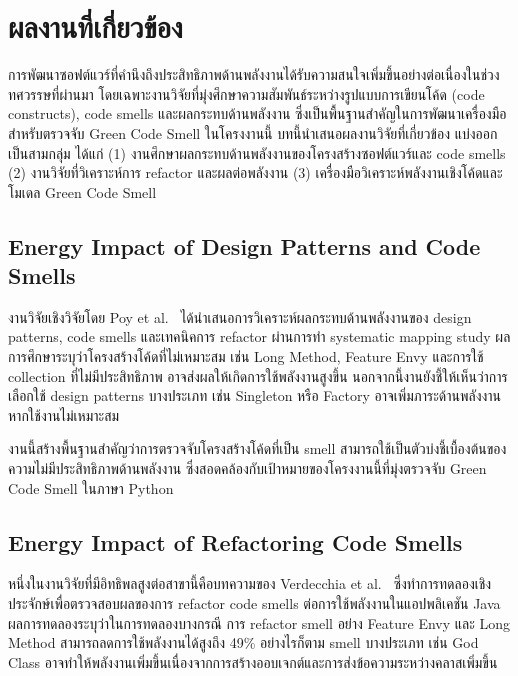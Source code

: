 \chapter{ผลงานที่เกี่ยวข้อง}
\label{Ch:RelatedWork}
การพัฒนาซอฟต์แวร์ที่คำนึงถึงประสิทธิภาพด้านพลังงานได้รับความสนใจเพิ่มขึ้นอย่างต่อเนื่องในช่วงทศวรรษที่ผ่านมา โดยเฉพาะงานวิจัยที่มุ่งศึกษาความสัมพันธ์ระหว่างรูปแบบการเขียนโค้ด (code constructs), code smells และผลกระทบด้านพลังงาน ซึ่งเป็นพื้นฐานสำคัญในการพัฒนาเครื่องมือสำหรับตรวจจับ Green Code Smell ในโครงงานนี้ บทนี้นำเสนอผลงานวิจัยที่เกี่ยวข้อง แบ่งออกเป็นสามกลุ่ม ได้แก่ (1) งานศึกษาผลกระทบด้านพลังงานของโครงสร้างซอฟต์แวร์และ code smells (2) งานวิจัยที่วิเคราะห์การ refactor และผลต่อพลังงาน (3) เครื่องมือวิเคราะห์พลังงานเชิงโค้ดและโมเดล Green Code Smell


\section{Energy Impact of Design Patterns and Code Smells}
งานวิจัยเชิงวิจัยโดย Poy et al.~\cite{poy2025impact} ได้นำเสนอการวิเคราะห์ผลกระทบด้านพลังงานของ design patterns, code smells และเทคนิคการ refactor ผ่านการทำ systematic mapping study ผลการศึกษาระบุว่าโครงสร้างโค้ดที่ไม่เหมาะสม เช่น Long Method, Feature Envy และการใช้ collection ที่ไม่มีประสิทธิภาพ อาจส่งผลให้เกิดการใช้พลังงานสูงขึ้น นอกจากนี้งานยังชี้ให้เห็นว่าการเลือกใช้ design patterns บางประเภท เช่น Singleton หรือ Factory อาจเพิ่มภาระด้านพลังงานหากใช้งานไม่เหมาะสม

งานนี้สร้างพื้นฐานสำคัญว่าการตรวจจับโครงสร้างโค้ดที่เป็น smell สามารถใช้เป็นตัวบ่งชี้เบื้องต้นของความไม่มีประสิทธิภาพด้านพลังงาน ซึ่งสอดคล้องกับเป้าหมายของโครงงานนี้ที่มุ่งตรวจจับ Green Code Smell ในภาษา Python


\section{Energy Impact of Refactoring Code Smells}
หนึ่งในงานวิจัยที่มีอิทธิพลสูงต่อสาขานี้คือบทความของ Verdecchia et al.~\cite{verdecchia2018energy} ซึ่งทำการทดลองเชิงประจักษ์เพื่อตรวจสอบผลของการ refactor code smells ต่อการใช้พลังงานในแอปพลิเคชัน Java ผลการทดลองระบุว่าในการทดลองบางกรณี การ refactor smell อย่าง Feature Envy และ Long Method สามารถลดการใช้พลังงานได้สูงถึง 49\% อย่างไรก็ตาม smell บางประเภท เช่น God Class อาจทำให้พลังงานเพิ่มขึ้นเนื่องจากการสร้างออบเจกต์และการส่งข้อความระหว่างคลาสเพิ่มขึ้น


